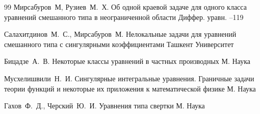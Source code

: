 \begin{thebibliography}{99}
\by Мирсабуров~М, Рузиев~М.~Х.
\paper Об одной краевой задаче для одного класса уравнений смешанного типа в неограниченной области
\jour Диффер. уравн.
--119


\by Салахитдинов~М.~С., Мирсабуров~М.
\book Нелокальные задачи для уравнений смешанного типа с сингулярными коэффициентами
\publaddr Ташкент
\publ Университет
%


\by Бицадзе~А.~В.
\book Некоторые классы уравнений в частных производных
\publaddr М.
\publ Наука 



\by Мусхелишвили~Н.~И.
\book Сингулярные интегральные уравнения. Граничные задачи теории функций и некоторые их приложения к математической физике
\publaddr М.
\publ Наука 


\by Гахов~Ф.~Д., Черский~Ю.~И.
\book Уравнения типа свертки
\publaddr М.
\publ Наука 


\end{thebibliography}



